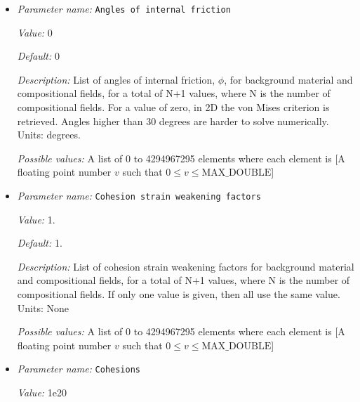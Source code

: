 \begin{itemize}
{\it Possible values:} A floating point number $v$ such that $0 \leq v \leq \text{MAX\_DOUBLE}$
\item {\it Parameter name:} {\tt Angles of internal friction}
\label{parameters:Material model/Visco Plastic/Angles of internal friction}
\label{parameters:Material_20model/Visco_20Plastic/Angles_20of_20internal_20friction}


{\it Value:} 0


{\it Default:} 0


{\it Description:} List of angles of internal friction, $\phi$, for background material and compositional fields, for a total of N+1 values, where N is the number of compositional fields. For a value of zero, in 2D the von Mises criterion is retrieved. Angles higher than 30 degrees are harder to solve numerically. Units: degrees.


{\it Possible values:} A list of 0 to 4294967295 elements where each element is [A floating point number $v$ such that $0 \leq v \leq \text{MAX\_DOUBLE}$]
\item {\it Parameter name:} {\tt Cohesion strain weakening factors}
\label{parameters:Material model/Visco Plastic/Cohesion strain weakening factors}
\label{parameters:Material_20model/Visco_20Plastic/Cohesion_20strain_20weakening_20factors}


{\it Value:} 1.


{\it Default:} 1.


{\it Description:} List of cohesion strain weakening factors for background material and compositional fields, for a total of N+1 values, where N is the number of compositional fields. If only one value is given, then all use the same value.  Units: None


{\it Possible values:} A list of 0 to 4294967295 elements where each element is [A floating point number $v$ such that $0 \leq v \leq \text{MAX\_DOUBLE}$]
\item {\it Parameter name:} {\tt Cohesions}
\label{parameters:Material model/Visco Plastic/Cohesions}
\label{parameters:Material_20model/Visco_20Plastic/Cohesions}


{\it Value:} 1e20



\end{itemize}
